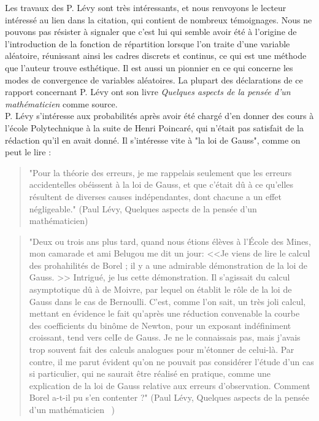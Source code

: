 \documentclass{article}
\begin{document}
Les travaux des P. Lévy sont très intéressants, et nous renvoyons le lecteur intéressé au lien dans la citation, qui contient de nombreux témoignages. Nous ne pouvons pas résister à signaler que c'est lui qui semble avoir été à l'origine de l'introduction de la fonction de répartition lorsque l'on traite d'une variable aléatoire, réunissant ainsi les cadres discrets et continus, ce qui est une méthode que l'auteur trouve esthétique. Il est aussi un pionnier en ce qui concerne les modes de convergence de variables aléatoires. La plupart des déclarations de ce rapport concernant P. Lévy ont son livre \textit{Quelques aspects de la pensée d'un mathématicien} comme source.\\

P. Lévy s'intéresse aux probabilités après avoir été chargé d'en donner des cours à l'école Polytechnique à la suite de Henri Poincaré, qui n'était pas satisfait de la rédaction qu'il en avait donné. Il s'intéresse vite à "la loi de Gauss", comme on peut le lire :

\begin{quotation}
"Pour la théorie des erreurs, je me rappelais seulement que les erreurs accidentelles obéissent à la loi de Gauss, et que c'était dû à ce qu'elles résultent de diverses causes indépendantes, dont chacune a un effet négligeable." (Paul Lévy, Quelques aspects de la pensée d'un mathématicien)\\
\end{quotation}

\begin{quotation}
"Deux ou trois ans plus tard, quand nous étions élèves à l'École des Mines, mon camarade et ami Belugou me dit un jour: <<Je 
viens de lire le calcul des prohahilités de Borel ; il y a une admirable démonstration de la loi de Gauss. >> Intrigué, je lus cette démonstration. Il s'agissait du calcul asymptotique dû à de Moivre, par lequel on établit le rôle de la loi de Gauss dans le cas de Bernoulli. C'est, comme l'on sait, un très joli calcul, mettant en évidence le fait qu'après une réduction convenable la courbe des coefficients du binôme de Newton, pour un exposant indéfiniment croissant, tend vers celIe de Gauss. Je ne le connaissais pas, mais j'avais trop souvent fait des calculs analogues pour m'étonner de celui-là. Par contre, il me parut évident qu'on ne pouvait pas considérer l'étude d'un cas si particulier, qui ne saurait être réalisé en pratique, comme une explication de la loi de Gauss relative aux erreurs d'observation. Comment Borel 
a-t-il pu s'en contenter ?" (Paul Lévy, Quelques aspects de la pensée d'un mathématicien ~\cite{Lévy}) \\
\end{quotation}
\end{document}
